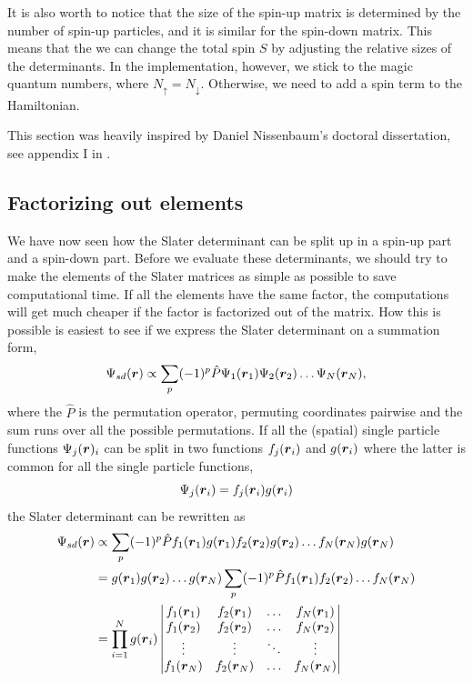 It is also worth to notice that the size of the spin-up matrix is determined by the number of spin-up particles, and it is similar for the spin-down matrix. This means that the we can change the total spin $S$ by adjusting the relative sizes of the determinants. In the implementation, however, we stick to the magic quantum numbers, where $N_{\uparrow}=N_{\downarrow}$. Otherwise, we need to add a spin term to the Hamiltonian.

This section was heavily inspired by Daniel Nissenbaum's doctoral dissertation, see appendix I in \cite{nissenbaum_stochastic_2008}.

\subsection{Factorizing out elements} \label{sec:factorizing}
We have now seen how the Slater determinant can be split up in a spin-up part and a spin-down part. Before we evaluate these determinants, we should try to make the elements of the Slater matrices as simple as possible to save computational time. If all the elements have the same factor, the computations will get much cheaper if the factor is factorized out of the matrix. How this is possible is easiest to see if we express the Slater determinant on a summation form,
\begin{equation}
\Psi_{sd}(\boldsymbol{{r}})\propto\sum_{p}(-1)^p\hat{P}\Psi_1(\boldsymbol{{r}}_1)\Psi_2(\boldsymbol{{r}}_2)\hdots\Psi_N(\boldsymbol{{r}}_N),
\label{eq:slatersum}
\end{equation}
where the $\hat{P}$ is the permutation operator, permuting coordinates pairwise and the sum runs over all the possible permutations. If all the (spatial) single particle functions $\Psi_j(\boldsymbol{{r}})_i$ can be split in two functions $f_j(\boldsymbol{{r}}_i)$ and $g(\boldsymbol{{r}}_i)$ where the latter is common for all the single particle functions,
\begin{equation}
\Psi_j(\boldsymbol{{r}}_i)=f_j(\boldsymbol{{r}}_i)g(\boldsymbol{{r}}_i)
\end{equation}
the Slater determinant can be rewritten as
\begin{equation}
\begin{aligned}
\Psi_{sd}(\boldsymbol{{r}})&\propto\sum_{p}(-1)^p\hat{P}f_1(\boldsymbol{{r}}_1)g(\boldsymbol{{r}}_1)f_2(\boldsymbol{{r}}_2)g(\boldsymbol{{r}}_2)\hdots f_N(\boldsymbol{{r}}_N)g(\boldsymbol{{r}}_N)\\
&=g(\boldsymbol{{r}}_1)g(\boldsymbol{{r}}_2)\hdots g(\boldsymbol{{r}}_N)\sum_{p}(-1)^p\hat{P}f_1(\boldsymbol{{r}}_1)f_2(\boldsymbol{{r}}_2)\hdots f_N(\boldsymbol{{r}}_N)\\
&=\prod_{i=1}^Ng(\boldsymbol{{r}}_i)
\begin{vmatrix}
f_1(\boldsymbol{r}_1) & f_2(\boldsymbol{r}_1) & \hdots & f_N(\boldsymbol{r}_1)\\
f_1(\boldsymbol{r}_2) & f_2(\boldsymbol{r}_2) & \hdots & f_N(\boldsymbol{r}_2)\\
\vdots & \vdots & \ddots & \vdots \\
f_1(\boldsymbol{r}_N) & f_2(\boldsymbol{r}_N) & \hdots & f_N(\boldsymbol{r}_N)
\end{vmatrix}
\end{aligned}
\end{equation}
